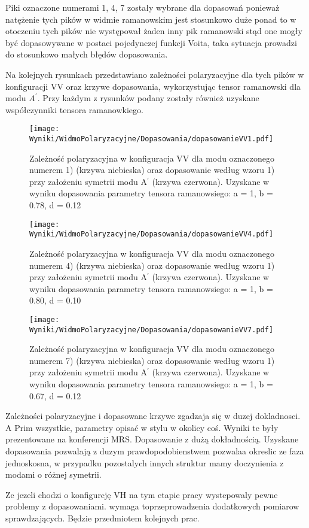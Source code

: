 Piki oznaczone numerami 1, 4, 7 zostały wybrane dla dopasowań ponieważ natężenie tych pików w widmie ramanowskim jest stosunkowo duże ponad to w otoczeniu tych pików nie występował żaden inny pik ramanowski stąd one mogły być dopasowywane w postaci pojedynczej funkcji Voita, taka sytuacja prowadzi do stosunkowo małych błędów dopasowania. 

Na kolejnych rysunkach przedstawiano zależności polaryzacyjne dla tych pików w konfiguracji VV oraz krzywe dopasowania, wykorzystując tensor ramanowski dla modu $A^{'}$. Przy każdym z rysunków podany zostały również uzyskane współczynniki tensora ramanowkiego.


\begin{figure}[H]
	\begin{center}
		\texttt{[image: Wyniki/WidmoPolaryzacyjne/Dopasowania/dopasowanieVV1.pdf]}
		\caption{Zależność polaryzacyjna w konfiguracja VV dla modu oznaczonego numerem 1) (krzywa niebieska) oraz dopasowanie według wzoru 1) przy założeniu symetrii modu A$^{'}$ (krzywa czerwona). Uzyskane w wyniku dopasowania parametry tensora ramanowsiego: a = 1, b = 0.78, d = 0.12} 
	\end{center}
\end{figure}

\begin{figure}[H]
	\begin{center}
		\texttt{[image: Wyniki/WidmoPolaryzacyjne/Dopasowania/dopasowanieVV4.pdf]}
		\caption{Zależność polaryzacyjna w konfiguracja VV dla modu oznaczonego numerem 4) (krzywa niebieska) oraz dopasowanie według wzoru 1) przy założeniu symetrii modu A$^{'}$ (krzywa czerwona). Uzyskane w wyniku dopasowania parametry tensora ramanowsiego: a = 1, b = 0.80, d = 0.10}
	\end{center}
\end{figure}

\begin{figure}[H]
	\begin{center}
		\texttt{[image: Wyniki/WidmoPolaryzacyjne/Dopasowania/dopasowanieVV7.pdf]}
		\caption{Zależność polaryzacyjna w konfiguracja VV dla modu oznaczonego numerem 7) (krzywa niebieska) oraz dopasowanie według wzoru 1) przy założeniu symetrii modu A$^{'}$ (krzywa czerwona). Uzyskane w wyniku dopasowania parametry tensora ramanowsiego: a = 1, b = 0.67, d = 0.12} 
	\end{center}
\end{figure}

Zależności polaryzacyjne i dopasowane krzywe zgadzaja się w duzej dokladnosci. A Prim wszystkie, parametry opisać w stylu w okolicy coś. Wyniki te były prezentowane na konferencji MRS. Dopasowanie z dużą dokładnością. Uzyskane dopasowania pozwalają z duzym prawdopodobienstwem pozwalaa okreslic ze faza jednoskosna, w przypadku pozostalych innych struktur mamy doczynienia z modami o różnej symetrii. 

Ze jezeli chodzi o konfigurcję VH na tym etapie pracy wystepowaly pewne problemy z dopasowaniami. wymaga toprzeprowadzenia dodatkowych pomiarow sprawdzających. Będzie przedmiotem kolejnych prac.

